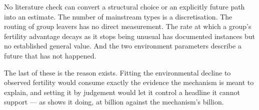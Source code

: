 No literature check can convert a structural choice or an explicitly future path
into an estimate. The number of mainstream types is a discretisation. The routing
of group leavers has no direct measurement. The rate at which a group's fertility
advantage decays as it stops being unusual has documented instances but no
established general value. And the two environment parameters describe a future
that has not happened.

The last of these is the reason  exists. Fitting the
environmental decline to observed fertility would consume exactly the evidence
the mechanism is meant to explain, and setting it by judgement would let it
control a headline it cannot support --- as  shows it doing,
at \LadderPressureLoss{} billion against the mechanism's
\LadderMainstreamGain{} billion.
